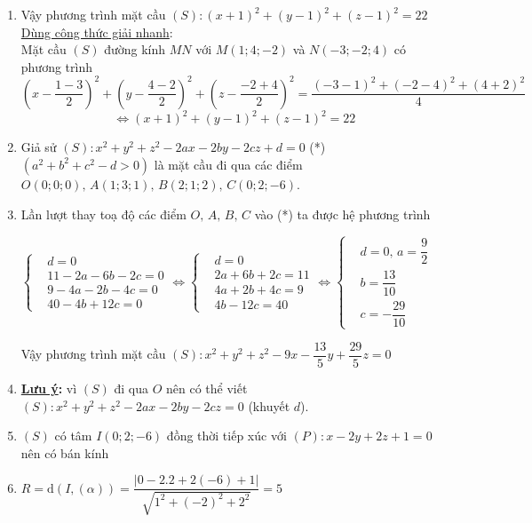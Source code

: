 \begin{vd}
{\begin{enumerate}
			$(S)$ có đường kính $MN$ nên có tâm $I$ và bán kính $R=\dfrac{1}{2}MN=\sqrt{22}$
			\item[] Vậy phương trình mặt cầu $(S)\colon (x+1)^2+(y-1)^2+(z-1)^2=22$\\
			\underline{Dùng công thức giải nhanh}:\\
			Mặt cầu $(S)$ đường kính $MN$ với $M(1;4;-2)$ và $N(-3;-2;4)$ có phương trình
				$$\left(x-\dfrac{1-3}{2}\right)^2+\left(y-\dfrac{4-2}{2}\right)^2+\left(z-\dfrac{-2+4}{2}\right)^2=\dfrac{(-3-1)^2+(-2-4)^2+(4+2)^2}{4}$$
				$$\Leftrightarrow (x+1)^2+(y-1)^2+(z-1)^2=22$$
			\item Giả sử $(S)\colon x^2+y^2+z^2-2ax-2by-2cz+d=0$ (*) $(a^2+b^2+c^2-d>0)$ là mặt cầu
			đi qua các điểm $O(0;0;0),\,A(1;3;1),\,B(2;1;2),\,C(0;2;-6)$. \vspace{-0.2cm}
			\item[] Lần lượt thay toạ độ các điểm $O,\,A,\,B,\,C$ vào (*) ta được hệ phương trình\\
			\centerline{$\left\{\begin{aligned}
				&d=0\\&11-2a-6b-2c=0 \\
				&9-4a-2b-4c=0 \\
				&40-4b+12c=0
				\end{aligned}\right. \Leftrightarrow \left\{\begin{aligned}
				&d=0\\&2a+6b+2c=11 \\
				&4a+2b+4c=9 \\
				&4b-12c=40
				\end{aligned}\right. \Leftrightarrow \left\{\begin{aligned}
				&d=0,\,a=\dfrac{9}{2} \\
				&b=\dfrac{13}{10} \\
				&c=-\dfrac{29}{10}
				\end{aligned}\right. $}
			Vậy phương trình mặt cầu $(S)\colon x^2+y^2+z^2-9x-\dfrac{13}{5}y+\dfrac{29}{5}z=0$\vspace{-0.1cm}
			\item[] \textbf{\underline{Lưu ý}:} vì $(S)$ đi qua $O$ nên có thể viết $(S)\colon x^2+y^2+z^2-2ax-2by-2cz=0$ (khuyết $d$).
			\item $(S)$ có tâm $I(0;2;-6)$ đồng thời tiếp xúc với $(P)\colon x-2y+2z+1=0$
			nên có bán kính
			\item[] \centerline{ $R=\mathrm{d}\left(I,(\alpha)\right)=\dfrac{|0-2.2+2(-6)+1|}{\sqrt{1^2+(-2)^2+2^2}}=5$}\vspace{-0.5cm}

\end{enumerate}}
\end{vd}
